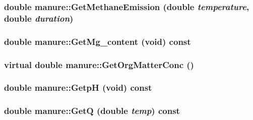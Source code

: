 \label{classmanure_aa608bf6f9be6d1d02c6788dfb8a6eadf}
\hypertarget{classmanure_a6ecbd94610934e7ee281c62ea8d2fcde}{
\subsubsection[{GetMethaneEmission}]{\setlength{\rightskip}{0pt plus 5cm}double manure::GetMethaneEmission (double {\em temperature}, \/  double {\em duration})}}
\label{classmanure_a6ecbd94610934e7ee281c62ea8d2fcde}
\hypertarget{classmanure_a33d61ff2bca9b2344ca013d284176395}{
\subsubsection[{GetMg\_\-content}]{\setlength{\rightskip}{0pt plus 5cm}double manure::GetMg\_\-content (void) const}}
\label{classmanure_a33d61ff2bca9b2344ca013d284176395}
\hypertarget{classmanure_ad293bc0666ccc034fe1f15a1df2a4010}{
\subsubsection[{GetOrgMatterConc}]{\setlength{\rightskip}{0pt plus 5cm}virtual double manure::GetOrgMatterConc ()}}
\label{classmanure_ad293bc0666ccc034fe1f15a1df2a4010}
\hypertarget{classmanure_aeb6b9f64e829c8f799cd771c6090cdcf}{
\subsubsection[{GetpH}]{\setlength{\rightskip}{0pt plus 5cm}double manure::GetpH (void) const}}
\label{classmanure_aeb6b9f64e829c8f799cd771c6090cdcf}
\hypertarget{classmanure_a7b77b90caee4bc5fcf2dea610ffdd321}{
\subsubsection[{GetQ}]{\setlength{\rightskip}{0pt plus 5cm}double manure::GetQ (double {\em temp}) const}}
